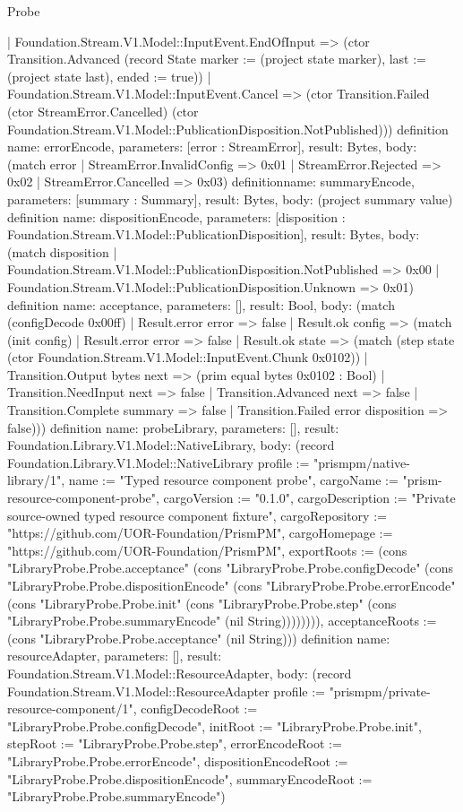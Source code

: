 \begin{lexlean}{Probe}
\begin{semanticmodule}
{    | Foundation.Stream.V1.Model::InputEvent.EndOfInput => (ctor Transition.Advanced (record State {marker := (project state marker), last := (project state last), ended := true}))
    | Foundation.Stream.V1.Model::InputEvent.Cancel => (ctor Transition.Failed (ctor StreamError.Cancelled) (ctor Foundation.Stream.V1.Model::PublicationDisposition.NotPublished)))
}
definition{
  name: errorEncode, parameters: [error : StreamError], result: Bytes,
  body: (match error | StreamError.InvalidConfig => 0x01 | StreamError.Rejected => 0x02 | StreamError.Cancelled => 0x03)
}
definition{name: summaryEncode, parameters: [summary : Summary], result: Bytes, body: (project summary value)}
definition{
  name: dispositionEncode, parameters: [disposition : Foundation.Stream.V1.Model::PublicationDisposition], result: Bytes,
  body: (match disposition | Foundation.Stream.V1.Model::PublicationDisposition.NotPublished => 0x00 | Foundation.Stream.V1.Model::PublicationDisposition.Unknown => 0x01)
}
definition{
  name: acceptance, parameters: [], result: Bool,
  body: (match (configDecode 0x00ff)
    | Result.error error => false
    | Result.ok config => (match (init config)
      | Result.error error => false
      | Result.ok state => (match (step state (ctor Foundation.Stream.V1.Model::InputEvent.Chunk 0x0102))
        | Transition.Output bytes next => (prim equal bytes 0x0102 : Bool)
        | Transition.NeedInput next => false
        | Transition.Advanced next => false
        | Transition.Complete summary => false
        | Transition.Failed error disposition => false)))
}
definition{
  name: probeLibrary, parameters: [], result: Foundation.Library.V1.Model::NativeLibrary,
  body: (record Foundation.Library.V1.Model::NativeLibrary {profile := "prismpm/native-library/1", name := "Typed resource component probe", cargoName := "prism-resource-component-probe", cargoVersion := "0.1.0", cargoDescription := "Private source-owned typed resource component fixture", cargoRepository := "https://github.com/UOR-Foundation/PrismPM", cargoHomepage := "https://github.com/UOR-Foundation/PrismPM", exportRoots := (cons "LibraryProbe.Probe.acceptance" (cons "LibraryProbe.Probe.configDecode" (cons "LibraryProbe.Probe.dispositionEncode" (cons "LibraryProbe.Probe.errorEncode" (cons "LibraryProbe.Probe.init" (cons "LibraryProbe.Probe.step" (cons "LibraryProbe.Probe.summaryEncode" (nil String)))))))), acceptanceRoots := (cons "LibraryProbe.Probe.acceptance" (nil String))})
}
definition{
  name: resourceAdapter, parameters: [], result: Foundation.Stream.V1.Model::ResourceAdapter,
  body: (record Foundation.Stream.V1.Model::ResourceAdapter {profile := "prismpm/private-resource-component/1", configDecodeRoot := "LibraryProbe.Probe.configDecode", initRoot := "LibraryProbe.Probe.init", stepRoot := "LibraryProbe.Probe.step", errorEncodeRoot := "LibraryProbe.Probe.errorEncode", dispositionEncodeRoot := "LibraryProbe.Probe.dispositionEncode", summaryEncodeRoot := "LibraryProbe.Probe.summaryEncode"})
}
\end{semanticmodule}
\end{lexlean}
